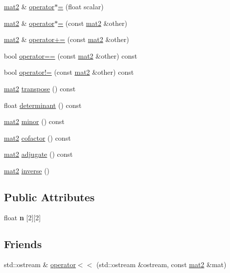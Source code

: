 \begin{DoxyCompactItemize}
\item 
\hyperlink{structmath_1_1mat2}{mat2} \& \hyperlink{structmath_1_1mat2_ab9b8cc4b90979edce51e50228c9b3225}{operator$\ast$=} (float scalar)
\item 
\hyperlink{structmath_1_1mat2}{mat2} \& \hyperlink{structmath_1_1mat2_a908aae05345831bc50a889605c15bd81}{operator$\ast$=} (const \hyperlink{structmath_1_1mat2}{mat2} \&other)
\item 
\hyperlink{structmath_1_1mat2}{mat2} \& \hyperlink{structmath_1_1mat2_a7266a3b96614a92227581b6ff656021f}{operator+=} (const \hyperlink{structmath_1_1mat2}{mat2} \&other)
\item 
bool \hyperlink{structmath_1_1mat2_a86e3e0f8ba4337a1ff13069df2ce77b4}{operator==} (const \hyperlink{structmath_1_1mat2}{mat2} \&other) const
\item 
bool \hyperlink{structmath_1_1mat2_aef4aa6b1daded9861c6efd4f5e6366b8}{operator!=} (const \hyperlink{structmath_1_1mat2}{mat2} \&other) const
\item 
\hyperlink{structmath_1_1mat2}{mat2} \hyperlink{structmath_1_1mat2_ad005191511a9be3a91dca76960607394}{transpose} () const
\item 
float \hyperlink{structmath_1_1mat2_ac4f7c1b4967c8f9c9857eb346ff8c0e3}{determinant} () const
\item 
\hyperlink{structmath_1_1mat2}{mat2} \hyperlink{structmath_1_1mat2_a960118b3ee04534dd99d5577496193f4}{minor} () const
\item 
\hyperlink{structmath_1_1mat2}{mat2} \hyperlink{structmath_1_1mat2_ac3be1c005e806fc3a517c09c37be44ba}{cofactor} () const
\item 
\hyperlink{structmath_1_1mat2}{mat2} \hyperlink{structmath_1_1mat2_a3690044fe3bbd155a1298a6b3f047705}{adjugate} () const
\item 
\hyperlink{structmath_1_1mat2}{mat2} \hyperlink{structmath_1_1mat2_aa3e143e6c1338df92888a623b2ace226}{inverse} ()
\end{DoxyCompactItemize}
\subsection*{Public Attributes}
\begin{DoxyCompactItemize}
\item 
\mbox{\label{structmath_1_1mat2_a89819bfffc570afb89d104ca362eee47}} 
float {\bfseries n} \mbox{[}2\mbox{]}\mbox{[}2\mbox{]}
\end{DoxyCompactItemize}
\subsection*{Friends}
\begin{DoxyCompactItemize}
\item 
std\+::ostream \& \hyperlink{structmath_1_1mat2_a651162fc04bdf7d98bdf9b7586443e5c}{operator$<$$<$} (std\+::ostream \&ostream, const \hyperlink{structmath_1_1mat2}{mat2} \&mat)
\end{DoxyCompactItemize}


